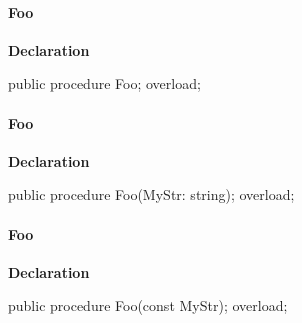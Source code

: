 \documentclass{report}
\begin{document}
\paragraph*{Foo}\hspace*{\fill}

\begin{list}{}{
\setlength{\itemindent}{0cm}
\setlength{\listparindent}{0cm}
\setlength{\leftmargin}{\evensidemargin}
\addtolength{\leftmargin}{\tmplength}
\settowidth{\labelsep}{X}
\addtolength{\leftmargin}{\labelsep}
\setlength{\labelwidth}{\tmplength}
}
\begin{flushleft}
\item[\textbf{Declaration}\hfill]
\begin{ttfamily}
public procedure Foo; overload;\end{ttfamily}


\end{flushleft}
\end{list}
\paragraph*{Foo}\hspace*{\fill}

\begin{list}{}{
\setlength{\itemindent}{0cm}
\setlength{\listparindent}{0cm}
\setlength{\leftmargin}{\evensidemargin}
\addtolength{\leftmargin}{\tmplength}
\settowidth{\labelsep}{X}
\addtolength{\leftmargin}{\labelsep}
\setlength{\labelwidth}{\tmplength}
}
\begin{flushleft}
\item[\textbf{Declaration}\hfill]
\begin{ttfamily}
public procedure Foo(MyStr: string); overload;\end{ttfamily}


\end{flushleft}
\end{list}
\paragraph*{Foo}\hspace*{\fill}

\begin{list}{}{
\setlength{\itemindent}{0cm}
\setlength{\listparindent}{0cm}
\setlength{\leftmargin}{\evensidemargin}
\addtolength{\leftmargin}{\tmplength}
\settowidth{\labelsep}{X}
\addtolength{\leftmargin}{\labelsep}
\setlength{\labelwidth}{\tmplength}
}
\begin{flushleft}
\item[\textbf{Declaration}\hfill]
\begin{ttfamily}
public procedure Foo(const MyStr); overload;\end{ttfamily}


\end{flushleft}
\end{list}
\end{document}
